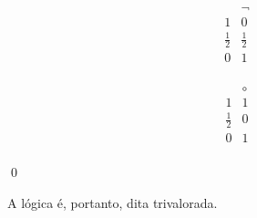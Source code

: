 \begin{definicao}
        \vspace{0.5cm}

        \begin{minipage}{0.5\textwidth}
            \[
                \begin{array}{c|c}
                                & \neg        \\
                    \hline
                    1           & 0           \\
                    \frac{1}{2} & \frac{1}{2} \\
                    0           & 1           \\
                \end{array}
            \]
        \end{minipage}
        \begin{minipage}{0.3\textwidth}
            \[
                \begin{array}{c|c}
                                & \circ   \\
                    \hline
                    1           & 1         \\
                    \frac{1}{2} & 0         \\
                    0           & 1         \\
                \end{array}
            \]
        \end{minipage}

        \noindent
        \qed{}
    \end{definicao}

    A lógica \lfium{} é, portanto, dita trivalorada.

